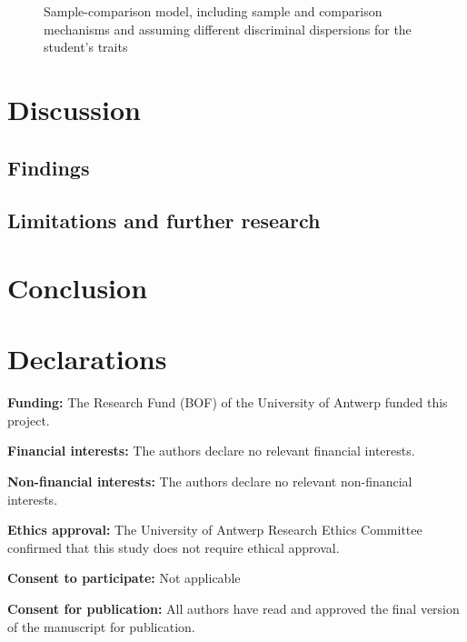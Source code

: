 \documentclass[
  authoryear,
  review,
  1p]{elsarticle}
\begin{document}
\begin{figure}[H]
\begin{minipage}{0.50\linewidth}
{}


\end{minipage}%

\caption{\label{fig-cj15}Sample-comparison model, including sample and
comparison mechanisms and assuming different discriminal dispersions for
the student's traits}

\end{figure}%

\section{Discussion}\label{sec-discussion}

\subsection{Findings}\label{sec-discussion-finding}

\subsection{Limitations and further
research}\label{sec-discussion-limitations}

\section{Conclusion}\label{sec-conclusion}

\newpage{}

\section*{Declarations}\label{declarations}

\textbf{Funding:} The Research Fund (BOF) of the University of Antwerp
funded this project.

\textbf{Financial interests:} The authors declare no relevant financial
interests.

\textbf{Non-financial interests:} The authors declare no relevant
non-financial interests.

\textbf{Ethics approval:} The University of Antwerp Research Ethics
Committee confirmed that this study does not require ethical approval.

\textbf{Consent to participate:} Not applicable

\textbf{Consent for publication:} All authors have read and approved the
final version of the manuscript for publication.
\end{document}
